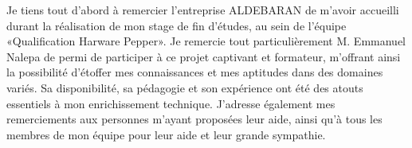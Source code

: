 Je tiens tout d’abord à remercier l’entreprise ALDEBARAN de m’avoir accueilli durant la réalisation de mon stage de fin d'études, au sein de l'équipe «Qualification Harware Pepper».
Je remercie tout particulièrement M. Emmanuel Nalepa de permi de participer à ce projet captivant et formateur, m’offrant ainsi la possibilité d'étoffer mes connaissances et mes aptitudes dans des domaines variés. Sa disponibilité, sa pédagogie et son expérience ont été des atouts essentiels à mon enrichissement technique.
J’adresse également mes remerciements aux personnes m'ayant proposées leur aide, ainsi qu'à tous les membres de mon équipe pour leur aide et leur grande sympathie.